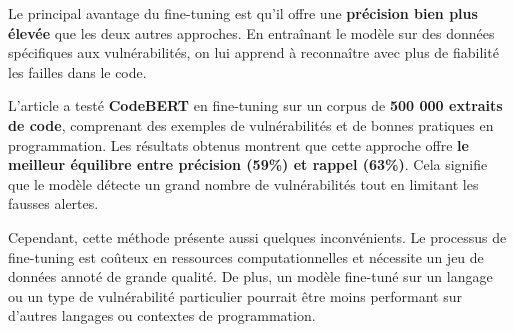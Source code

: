 Le principal avantage du fine-tuning est
qu’il offre une \textbf{précision bien plus élevée} que les deux autres
approches. En entraînant le modèle sur des données spécifiques aux
vulnérabilités, on lui apprend à reconnaître avec plus de fiabilité les failles
dans le code.



L’article a testé \textbf{CodeBERT} en
fine-tuning sur un corpus de \textbf{500 000 extraits de code}, comprenant des
exemples de vulnérabilités et de bonnes pratiques en programmation. Les
résultats obtenus montrent que cette approche offre \textbf{le meilleur équilibre
entre précision (59\%) et rappel (63\%)}. Cela signifie que le modèle détecte
un grand nombre de vulnérabilités tout en limitant les fausses alertes.



Cependant, cette méthode présente aussi
quelques inconvénients. Le processus de fine-tuning est coûteux en ressources
computationnelles et nécessite un jeu de données annoté de grande qualité. De
plus, un modèle fine-tuné sur un langage ou un type de vulnérabilité
particulier pourrait être moins performant sur d’autres langages ou contextes
de programmation.





